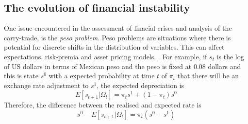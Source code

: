 \documentclass[12pt, a4paper, oneside]{article} %
\begin{document}

\subsection{The evolution of financial instability}
One issue encountered in the assessment of finacial crises and analysis of the carry-trade, is the \emph{peso problem}. Peso problems are situations where there is  potential for discrete shifts in the distribution of variables.  This can affect expectations, risk-premia and asset pricing models. \citet{evans199621}.  For example, if $s_t$ is the log of US dollars in terms of Mexican peso and the peso is fixed at 0.08 dollars and this is state $s^0$ with a expected probability at time $t$ of $\pi_t$ that there will be an exchange rate adjustment to $s^1$, the expected depreciation is 
\begin{equation}
E[s_{t+1}|\Omega_t] = \pi_ts^1 + (1 - \pi_t)s^0
\end{equation}
Therefore, the difference between the realised and expected rate is 
\begin{equation}
s^0 - E[s_{t+1}|\Omega_t] = \pi_t(s^0 - s^1)
\end{equation}

\end{document}
